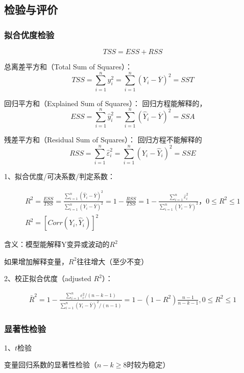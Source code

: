 \documentclass[12pt]{book}
\begin{document}
\subsection{检验与评价}

\subsubsection{拟合优度检验}

$$
TSS=ESS+RSS
$$

\par 总离差平方和（Total Sum of Squares）：  
$$ TSS=\sum_{i=1}^{n}y_i^2=\sum_{i=1}^{n}\left(Y_i-\overline{Y}\right)^2=SST $$  
\par 回归平方和（Explained Sum of Squares）： 回归方程能解释的，  
$$ ESS=\sum_{i=1}^{n}{\hat{y}}_i^2=\sum_{i=1}^{n}\left({\hat{Y}}_i-\overline{Y}\right)^2=SSA $$
\par 残差平方和（Residual Sum of Squares）： 回归方程不能解释的  
$$ RSS=\sum_{i=1}^{n}{\hat{\varepsilon}}_i^2=\sum_{i=1}^{n}\left(Y_i-{\hat{Y}}_i\right)^2=SSE $$


1、拟合优度/可决系数/判定系数：

\begin{gather*}
R^2=\frac{ESS}{TSS} 
=\frac{\sum_{i=1}^{n}\left({\hat{Y}}_i-\overline{Y}\right)^2}{\sum_{i=1}^{n}\left(Y_i-\overline{Y}\right)^2} 
=1-\frac{RSS}{TSS}
=1-\frac{\sum_{i=1}^{n}{\hat{\varepsilon}}_i^2}{\sum_{i=1}^{n}\left(Y_i-\overline{Y}\right)^2}，0≤R^2≤1 \\ 
R^2=\left[Corr\left(Y_i,{\hat{Y}}_i\right)\right]^2
\end{gather*}


\par 含义：模型能解释Y变异或波动的$R^2$  
\par 如果增加解释变量，$R^2$往往增大（至少不变）

2、校正拟合优度（adjusted $R^2$）：

\begin{gather*}
    {\bar{R}}^2 
=1-\frac{\sum_{i=1}^{n}{\varepsilon_i^2/(n-k-1)}}{\sum_{i=1}^{n}{(Y_i-\bar{Y})^2}/(n-1)} 
=1-(1-R^2)\frac{n-1}{n-k-1}, 0\leqslant R^2\leqslant 1
\end{gather*}


\subsubsection{显著性检验}

1、$t$检验

变量回归系数的显著性检验（$n-k\geq 8$时较为稳定）
\end{document}
